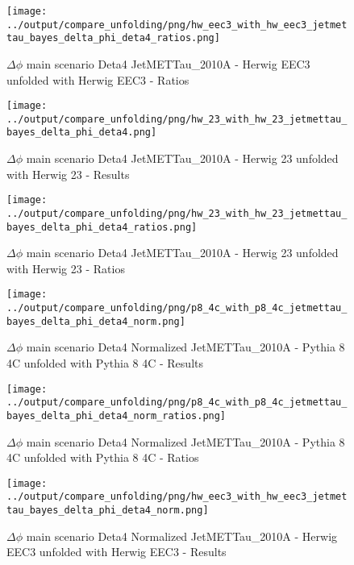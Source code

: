 \documentclass[11pt]{book}
\begin{document}
\begin{figure}[ht]
\centering
\texttt{[image: ../output/compare\_unfolding/png/hw\_eec3\_with\_hw\_eec3\_jetmettau\_bayes\_delta\_phi\_deta4\_ratios.png]}
\caption{$\Delta\phi$ main scenario Deta4 JetMETTau\_2010A - Herwig EEC3 unfolded with Herwig EEC3 - Ratios}
\label{hw_eec3_hw_eec3_jetmettau_bayes_delta_phi_deta4_b}
\end{figure}

\begin{figure}[ht]
\centering
\texttt{[image: ../output/compare\_unfolding/png/hw\_23\_with\_hw\_23\_jetmettau\_bayes\_delta\_phi\_deta4.png]}
\caption{$\Delta\phi$ main scenario Deta4 JetMETTau\_2010A - Herwig 23 unfolded with Herwig 23 - Results}
\label{hw_23_hw_23_jetmettau_bayes_delta_phi_deta4_a}
\end{figure}

\begin{figure}[ht]
\centering
\texttt{[image: ../output/compare\_unfolding/png/hw\_23\_with\_hw\_23\_jetmettau\_bayes\_delta\_phi\_deta4\_ratios.png]}
\caption{$\Delta\phi$ main scenario Deta4 JetMETTau\_2010A - Herwig 23 unfolded with Herwig 23 - Ratios}
\label{hw_23_hw_23_jetmettau_bayes_delta_phi_deta4_b}
\end{figure}

\begin{figure}[ht]
\centering
\texttt{[image: ../output/compare\_unfolding/png/p8\_4c\_with\_p8\_4c\_jetmettau\_bayes\_delta\_phi\_deta4\_norm.png]}
\caption{$\Delta\phi$ main scenario Deta4 Normalized JetMETTau\_2010A - Pythia 8 4C unfolded with Pythia 8 4C - Results}
\label{p8_p8_jetmettau_bayes_delta_phi_deta4_norm_a}
\end{figure}

\begin{figure}[ht]
\centering
\texttt{[image: ../output/compare\_unfolding/png/p8\_4c\_with\_p8\_4c\_jetmettau\_bayes\_delta\_phi\_deta4\_norm\_ratios.png]}
\caption{$\Delta\phi$ main scenario Deta4 Normalized JetMETTau\_2010A - Pythia 8 4C unfolded with Pythia 8 4C - Ratios}
\label{p8_p8_jetmettau_bayes_delta_phi_deta4_norm_b}
\end{figure}

\begin{figure}[ht]
\centering
\texttt{[image: ../output/compare\_unfolding/png/hw\_eec3\_with\_hw\_eec3\_jetmettau\_bayes\_delta\_phi\_deta4\_norm.png]}
\caption{$\Delta\phi$ main scenario Deta4 Normalized JetMETTau\_2010A - Herwig EEC3 unfolded with Herwig EEC3 - Results}
\label{hw_eec3_hw_eec3_jetmettau_bayes_delta_phi_deta4_norm_a}
\end{figure}
\end{document}
